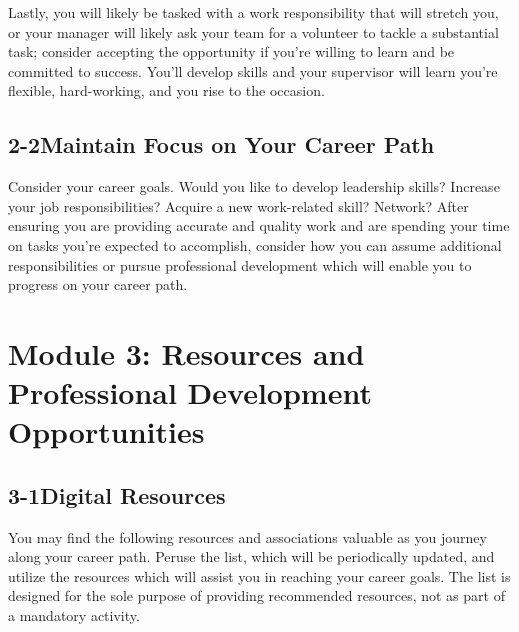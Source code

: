 Lastly, you will likely be tasked with a work responsibility that will stretch you, or your manager will likely ask your team for a volunteer to tackle a substantial task; consider accepting the opportunity if you’re willing to learn and be committed to success. You’ll develop skills and your supervisor will learn you’re flexible, hard-working, and you rise to the occasion.
\pagebreak \subsection*{2-2\quad Maintain Focus on Your Career Path}

Consider your career goals. Would you like to develop leadership skills? Increase your job responsibilities? Acquire a new work-related skill? Network? After ensuring you are providing accurate and quality work and are spending your time on tasks you’re expected to accomplish, consider how you can assume additional responsibilities or pursue professional development which will enable you to progress on your career path.
 
 
\pagebreak \section*{Module 3:	Resources and Professional Development Opportunities}
\noindent\makebox[\textwidth]{\rule{\linewidth}{0.4pt}} 
 \localtableofcontents 
\noindent\makebox[\textwidth]{\rule{\linewidth}{0.4pt}} 

\pagebreak \subsection*{3-1\quad Digital Resources}

You may find the following resources and associations valuable as you journey along your career path. Peruse the list, which will be periodically updated, and utilize the resources which will assist you in reaching your career goals. The list is designed for the sole purpose of providing recommended resources, not as part of a mandatory activity.


